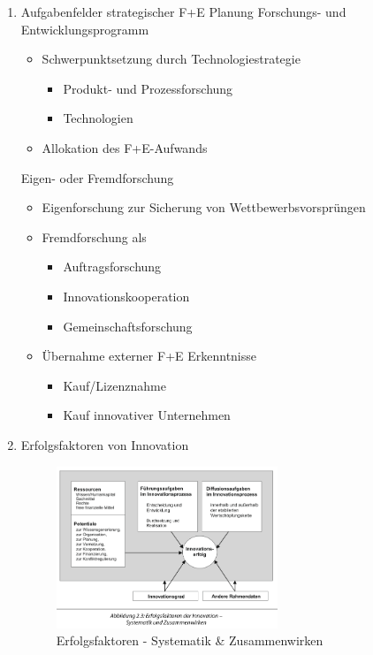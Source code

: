 \documentclass[11pt]{article}
\begin{document}
\begin{enumerate}
\item Aufgabenfelder strategischer F+E Planung
\label{sec:org85a6029}
Forschungs- und Entwicklungsprogramm
\begin{itemize}
\item Schwerpunktsetzung durch Technologiestrategie
\begin{itemize}
\item Produkt- und Prozessforschung
\item Technologien
\end{itemize}
\item Allokation des F+E-Aufwands
\end{itemize}

Eigen- oder Fremdforschung
\begin{itemize}
\item Eigenforschung zur Sicherung von Wettbewerbsvorsprüngen
\item Fremdforschung als 
\begin{itemize}
\item Auftragsforschung
\item Innovationskooperation
\item Gemeinschaftsforschung
\end{itemize}
\item Übernahme externer F+E Erkenntnisse
\begin{itemize}
\item Kauf/Lizenznahme
\item Kauf innovativer Unternehmen
\end{itemize}
\end{itemize}

\item Erfolgsfaktoren von Innovation
\label{sec:org3b8e4f2}
\begin{figure}[htbp]
\centering
\includegraphics[width=250px]{./pictures/inerf.png}
\caption{Erfolgsfaktoren - Systematik \& Zusammenwirken}
\end{figure}
\end{enumerate}
\end{document}
